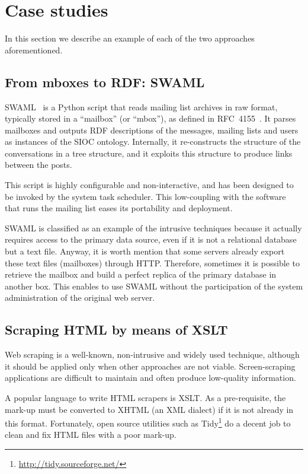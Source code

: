 \documentclass{../templates/www2008-submission}
\begin{document}
\section{Case studies}

In this section we describe an example of each of the two approaches
aforementioned.

\subsection{From mboxes to RDF: SWAML}

SWAML~\cite{SWAML2007} is a Python script that reads mailing 
list archives in raw format, typically stored in a ``mailbox'' 
(or ``mbox''), as defined in RFC~4155~\cite{RFC4155}. It parses
mailboxes and outputs RDF descriptions of the messages, mailing lists
and users as instances of the SIOC ontology. Internally, it re-constructs
the structure of the conversations in a tree structure, and it exploits
this structure to produce links between the posts.

This script is highly configurable and non-interactive, and has been
designed to be invoked by the system task scheduler. This low-coupling with
the software that runs the mailing list eases its portability and
deployment.

SWAML is classified as an example of the intrusive techniques because
it actually requires access to the primary data source, even if
it is not a relational database but a text file. Anyway, it is
worth mention that some servers already export these text files
(mailboxes) through HTTP. Therefore, sometimes it is possible to
retrieve the mailbox and build a perfect replica of the primary
database in another box. This enables to use SWAML without the
participation of the system administration of the original
web server.

\subsection{Scraping HTML by means of XSLT}

Web scraping is a well-known, non-intrusive and widely used technique,
although it should be applied only when other approaches are not viable.
Screen-scraping applications are difficult to maintain and
often produce low-quality information.

A popular language to write HTML scrapers is XSLT. As a pre-requisite,
the mark-up must be converted to XHTML (an XML dialect) if it is not
already in this format. Fortunately, open source utilities such as
Tidy\footnote{\url{http://tidy.sourceforge.net/}} do a decent job
to clean and fix HTML files with a poor mark-up.
\end{document}
